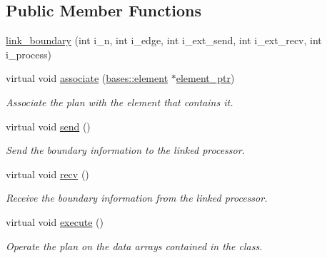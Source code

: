 \subsection*{Public Member Functions}
\begin{DoxyCompactItemize}
\item 
\hyperlink{classone__d_1_1link__boundary_a545f99303111cd43c474e0fb8753cfe4}{link\-\_\-boundary} (int i\-\_\-n, int i\-\_\-edge, int i\-\_\-ext\-\_\-send, int i\-\_\-ext\-\_\-recv, int i\-\_\-process)
\begin{DoxyCompactList}\small\item\em \end{DoxyCompactList}\item 
virtual void \hyperlink{classone__d_1_1link__boundary_a3c8652f7b39208dc58f34804a523cc36}{associate} (\hyperlink{classbases_1_1element}{bases\-::element} $\ast$\hyperlink{classbases_1_1plan_a54cd8904b8d499e5fc01c8060021d47b}{element\-\_\-ptr})
\begin{DoxyCompactList}\small\item\em Associate the plan with the element that contains it. \end{DoxyCompactList}\item 
virtual void \hyperlink{classone__d_1_1link__boundary_af16859eb2f5ce2d623456644fc21e91f}{send} ()
\begin{DoxyCompactList}\small\item\em Send the boundary information to the linked processor. \end{DoxyCompactList}\item 
virtual void \hyperlink{classone__d_1_1link__boundary_a6ad7e21758061ec53348b66d0143437b}{recv} ()
\begin{DoxyCompactList}\small\item\em Receive the boundary information from the linked processor. \end{DoxyCompactList}\item 
virtual void \hyperlink{classone__d_1_1link__boundary_a839303f3eb1a7c5fe204d3020eadaebb}{execute} ()
\begin{DoxyCompactList}\small\item\em Operate the plan on the data arrays contained in the class. \end{DoxyCompactList}\end{DoxyCompactItemize}
